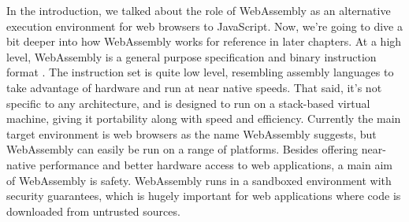 \documentclass[12pt,a4paper,twoside,openright]{report}
\begin{document}
In the introduction, we talked about the role of WebAssembly as an alternative execution environment for web browsers to JavaScript.
Now, we're going to dive a bit deeper into how WebAssembly works for reference in later chapters.
At a high level, WebAssembly is a general purpose specification and binary instruction format \cite{mozillawasm}.
The instruction set is quite low level, resembling assembly languages to take advantage of hardware and run at near native speeds.
That said, it's not specific to any architecture, and is designed to run on a stack-based virtual machine, giving it portability along with speed and efficiency.
Currently the main target environment is web browsers as the name WebAssembly suggests, but WebAssembly can easily be run on a range of platforms.
Besides offering near-native performance and better hardware access to web applications, a main aim of WebAssembly is safety.
WebAssembly runs in a sandboxed environment with security guarantees, which is hugely important for web applications where code is downloaded from untrusted sources.
\end{document}
